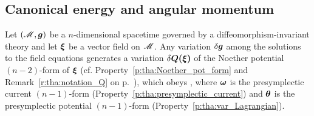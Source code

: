 \subsection{Canonical energy and angular momentum}

\begin{prop}
Let $(\mathscr{M},\bm{g})$ be a $n$-dimensional spacetime governed by a
diffeomorphism-invariant theory and let $\bm{\xi}$ be a vector field on $\mathscr{M}$.
Any variation $\delta\bm{g}$ among the solutions to the field equations
generates a variation $\delta\bm{Q}\textbf{(}\bm{\xi}\textbf{)}$ of the
Noether potential $(n-2)$-form of $\bm{\xi}$ (cf. Property~\ref{p:tha:Noether_pot_form}
and Remark~\ref{r:tha:notation_Q} on p.~\pageref{r:tha:notation_Q}),
which obeys
\be \label{e:tha:fund_identity}
    ,
\ee
where $\bm{\omega}$ is the presymplectic current $(n-1)$-form (Property~\ref{p:tha:presymplectic_current}) and $\bm{\theta}$ is
the presymplectic potential $(n-1)$-form (Property~\ref{p:tha:var_Lagrangian}).
\end{prop}


